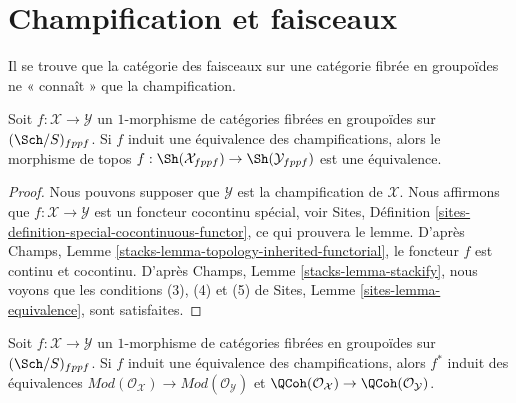 \section{Champification et faisceaux}
\label{section-stackification}

\noindent
Il se trouve que la catégorie des faisceaux sur une catégorie fibrée en
groupoïdes ne « connaît » que la champification.

\begin{lemma}
\label{lemma-stackification}
Soit $f : \mathcal{X} \to \mathcal{Y}$ un $1$-morphisme de catégories
fibrées en groupoïdes sur $(\Sch/S)_{fppf}$. Si
$f$ induit une équivalence des champifications, alors le morphisme
de topos
$f : \Sh(\mathcal{X}_{fppf}) \to \Sh(\mathcal{Y}_{fppf})$
est une équivalence.
\end{lemma}

\begin{proof}
Nous pouvons supposer que $\mathcal{Y}$ est la champification de $\mathcal{X}$.
Nous affirmons que $f : \mathcal{X} \to \mathcal{Y}$ est un foncteur
cocontinu spécial, voir
Sites, Définition \ref{sites-definition-special-cocontinuous-functor},
ce qui prouvera le lemme. D'après
Champs, Lemme \ref{stacks-lemma-topology-inherited-functorial},
le foncteur $f$ est continu et cocontinu. D'après
Champs, Lemme \ref{stacks-lemma-stackify},
nous voyons que les conditions (3), (4) et (5) de
Sites, Lemme \ref{sites-lemma-equivalence},
sont satisfaites.
\end{proof}

\begin{lemma}
\label{lemma-stackification-quasi-coherent}
Soit $f : \mathcal{X} \to \mathcal{Y}$ un $1$-morphisme de catégories
fibrées en groupoïdes sur $(\Sch/S)_{fppf}$. Si
$f$ induit une équivalence des champifications, alors $f^*$
induit des équivalences
$\textit{Mod}(\mathcal{O}_\mathcal{X}) \to
\textit{Mod}(\mathcal{O}_\mathcal{Y})$
et
$\QCoh(\mathcal{O}_\mathcal{X}) \to
\QCoh(\mathcal{O}_\mathcal{Y})$.
\end{lemma}

